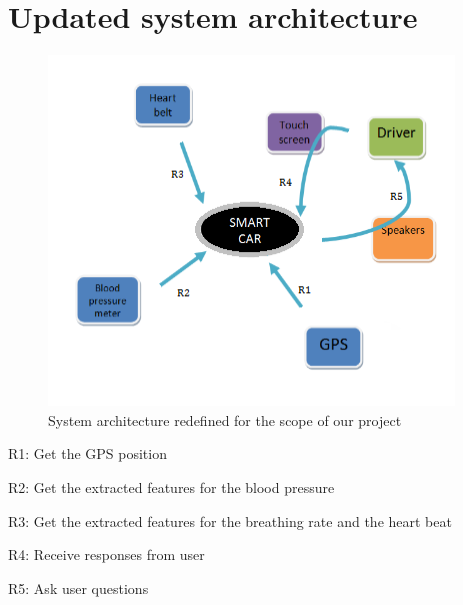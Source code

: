 \section{Updated system architecture}
\indent					%
\indent
\begin{figure}[h]
	\centering
	\includegraphics[scale=0.8]{./images/implementationArchitecture}		%
	\caption{System architecture redefined for the scope of our project}					%
	\label{fig:impsys}									%
\end{figure}

\begin{description}\addtolength{\itemsep}{-0.5\baselineskip}
	\item{R1:} Get the GPS position
	\item{R2:} Get the extracted features for the blood pressure
	\item{R3:} Get the extracted features for the breathing rate and the heart beat
	\item{R4:} Receive responses from user
	\item{R5:} Ask user questions
\end{description}